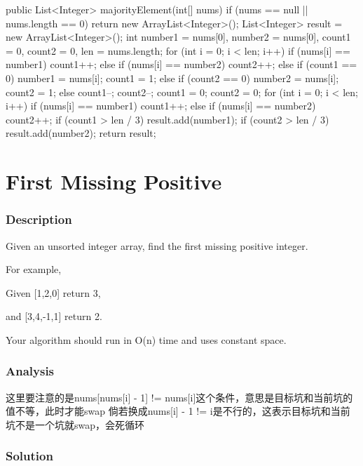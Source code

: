 \begin{Code}
public List<Integer> majorityElement(int[] nums) {
    if (nums == null || nums.length == 0)
        return new ArrayList<Integer>();
    List<Integer> result = new ArrayList<Integer>();
    int number1 = nums[0], number2 = nums[0], count1 = 0, count2 = 0, len = nums.length;
    for (int i = 0; i < len; i++) {
        if (nums[i] == number1)
            count1++;
        else if (nums[i] == number2)
            count2++;
        else if (count1 == 0) {
            number1 = nums[i];
            count1 = 1;
        } else if (count2 == 0) {
            number2 = nums[i];
            count2 = 1;
        } else {
            count1--;
            count2--;
        }
    }
    count1 = 0;
    count2 = 0;
    for (int i = 0; i < len; i++) {
        if (nums[i] == number1)
            count1++;
        else if (nums[i] == number2)
            count2++;
    }
    if (count1 > len / 3)
        result.add(number1);
    if (count2 > len / 3)
        result.add(number2);
    return result;
}
\end{Code}

\newpage

\section{First Missing Positive} %

\subsubsection{Description}
Given an unsorted integer array, find the first missing positive integer.

For example,

Given [1,2,0] return 3,

and [3,4,-1,1] return 2.

Your algorithm should run in O(n) time and uses constant space.

\subsubsection{Analysis}
 这里要注意的是nums[nums[i] - 1] != nums[i]这个条件，意思是目标坑和当前坑的值不等，此时才能swap
 倘若换成nums[i] - 1 != i是不行的，这表示目标坑和当前坑不是一个坑就swap，会死循环

\subsubsection{Solution}

